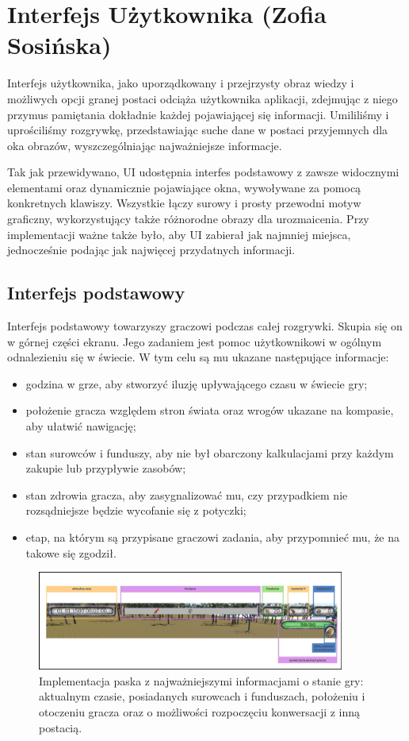 \section{Interfejs Użytkownika (Zofia Sosińska)}\label{chap:ui_imp}
Interfejs użytkownika, jako uporządkowany i przejrzysty obraz wiedzy i możliwych opcji granej postaci odciąża użytkownika
aplikacji, zdejmując z niego przymus pamiętania dokładnie każdej pojawiającej się informacji. Umililiśmy i uprościliśmy 
rozgrywkę, przedstawiając suche dane w postaci przyjemnych dla oka obrazów, wyszczególniając najważniejsze informacje.

Tak jak przewidywano, UI udostępnia interfes podstawowy z zawsze widocznymi elementami oraz dynamicznie pojawiające okna, wywoływane za pomocą konkretnych klawiszy.
Wszystkie łączy surowy i prosty przewodni motyw graficzny, wykorzystujący także różnorodne obrazy dla urozmaicenia. Przy implementacji ważne także było, aby UI zabierał
jak najmniej miejsca, jednocześnie podając jak najwięcej przydatnych informacji.

\subsection{Interfejs podstawowy}
Interfejs podstawowy towarzyszy graczowi podczas całej rozgrywki. Skupia się on w górnej części ekranu. Jego zadaniem jest pomoc 
użytkownikowi w ogólnym odnalezieniu się w świecie. W tym celu są mu ukazane następujące informacje:
\begin{itemize}
    \item godzina w grze, aby stworzyć iluzję upływającego czasu w świecie gry;
    \item położenie gracza względem stron świata oraz wrogów ukazane na kompasie, aby ułatwić nawigację;
    \item stan surowców i funduszy, aby nie był obarczony kalkulacjami przy każdym zakupie lub przypływie zasobów;
    \item stan zdrowia gracza, aby zasygnalizować mu, czy przypadkiem nie rozsądniejsze będzie wycofanie się z potyczki;
    \item etap, na którym są przypisane graczowi zadania, aby przypomnieć mu, że na takowe się zgodził.
\end{itemize}

\begin{figure}[htbp]
    \centering
    \includegraphics[width=0.9\textwidth]{images/ui/naszpasek.png}
    \caption{Implementacja paska z najważniejszymi informacjami o stanie gry: aktualnym czasie, posiadanych surowcach 
    i funduszach, położeniu i otoczeniu gracza oraz o możliwości rozpoczęciu konwersacji z inną postacią.
    }\label{fig:compass}
\end{figure}

